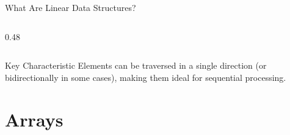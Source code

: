 \documentclass[aspectratio=169,xcolor=dvipsnames]{beamer}
\begin{document}
\begin{frame}{What Are Linear Data Structures?}
\begin{columns}
\begin{column}{0.48\textwidth}
    \end{column}
  \end{columns}

  \vspace{0.5cm}

  \begin{alertblock}{Key Characteristic}
    Elements can be traversed in a single direction (or bidirectionally in some cases), making them ideal for sequential processing.
  \end{alertblock}
\end{frame}

\section{Arrays}
\end{document}
